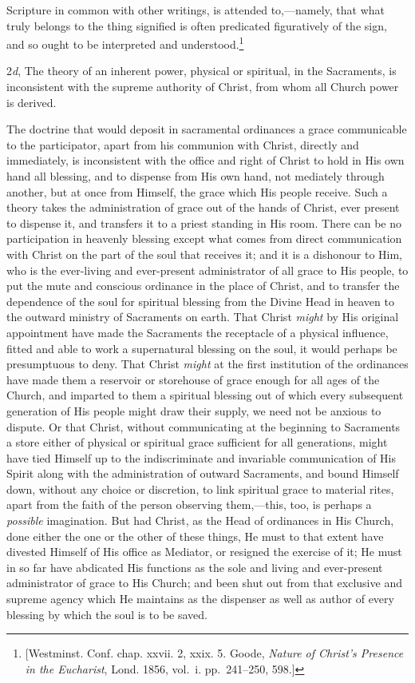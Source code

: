 \documentclass[english,]{book}
\begin{document}
Scripture in common with other writings, is attended to,---namely, that what truly belongs to the thing signified is often predicated figuratively of the sign, and so ought to be interpreted and understood.\footnote{{[}Westminst. Conf. chap. xxvii. 2, xxix. 5. Goode, \emph{Nature of Christ's Presence in the Eucharist}, Lond. 1856, vol.~i. pp.~241--250, 598.{]}}

2\emph{d}, The theory of an inherent power, physical or spiritual, in the Sacraments, is inconsistent with the supreme authority of Christ, from whom all Church power is derived.

The doctrine that would deposit in sacramental ordinances a grace communicable to the participator, apart from his communion with Christ, directly and immediately, is inconsistent with the office and right of Christ to hold in His own hand all blessing, and to dispense from His own hand, not mediately through another, but at once from Himself, the grace which His people receive. Such a theory takes the administration of grace out of the hands of Christ, ever present to dispense it, and transfers it to a priest standing in His room. There can be no participation in heavenly blessing except what comes from direct communication with Christ on the part of the soul that receives it; and it is a dishonour to Him, who is the ever-living and ever-present administrator of all grace to His people, to put the mute and conscious ordinance in the place of Christ, and to transfer the dependence of the soul for spiritual blessing from the Divine Head in heaven to the outward ministry of Sacraments on earth. That Christ \emph{might} by His original appointment have made the Sacraments the receptacle of a physical influence, fitted and able to work a supernatural blessing on the soul, it would perhaps be presumptuous to deny. That Christ \emph{might} at the first institution of the ordinances have made them a reservoir or storehouse of grace enough for all ages of the Church, and imparted to them a spiritual blessing out of which every subsequent generation of His people might draw their supply, we need not be anxious to dispute. Or that Christ, without communicating at the beginning to Sacraments a store either of physical or spiritual grace sufficient for all generations, might have tied Himself up to the indiscriminate and invariable communication of His Spirit along with the administration of outward Sacraments, and bound Himself down, without any choice or discretion, to link spiritual grace to material rites, apart from the faith of the person observing them,---this, too, is perhaps a \emph{possible} imagination. But had Christ, as the Head of ordinances in His Church, done either the one or the other of these things, He must to that extent have divested Himself of His office as Mediator, or resigned the exercise of it; He must in so far have abdicated His functions as the sole and living and ever-present administrator of grace to His Church; and been shut out from that exclusive and supreme agency which He maintains as the dispenser as well as author of every blessing by which the soul is to be saved.
\end{document}

